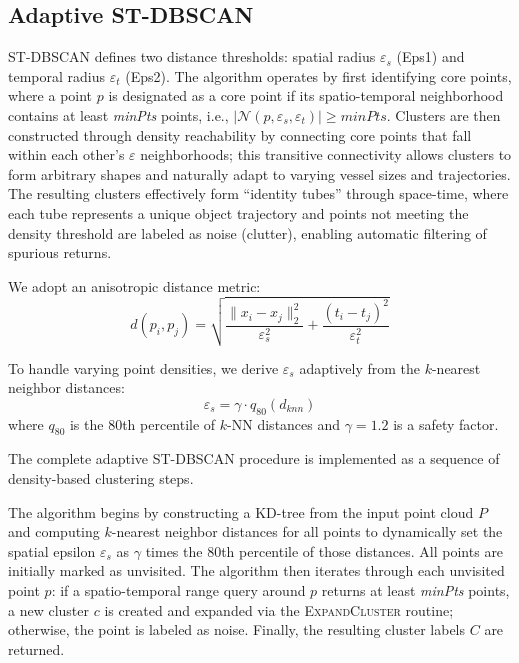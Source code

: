 \documentclass[conf]{new-aiaa}
\begin{document}
\subsection{Adaptive ST-DBSCAN}
ST-DBSCAN defines two distance thresholds: spatial radius $\varepsilon_s$ (Eps1) and temporal radius $\varepsilon_t$ (Eps2). The algorithm operates by first identifying core points, where a point $p$ is designated as a core point if its spatio-temporal neighborhood contains at least \textit{minPts} points, i.e., $|\mathcal{N}(p, \varepsilon_s, \varepsilon_t)| \geq \textit{minPts}$. Clusters are then constructed through density reachability by connecting core points that fall within each other's $\varepsilon$ neighborhoods; this transitive connectivity allows clusters to form arbitrary shapes and naturally adapt to varying vessel sizes and trajectories. The resulting clusters effectively form ``identity tubes'' through space-time, where each tube represents a unique object trajectory and points not meeting the density threshold are labeled as noise (clutter), enabling automatic filtering of spurious returns.

We adopt an anisotropic distance metric:
\begin{equation}
    d(p_i, p_j) = \sqrt{\frac{\|x_i - x_j\|_2^2}{\varepsilon_s^2} + \frac{(t_i - t_j)^2}{\varepsilon_t^2}}
\end{equation}

To handle varying point densities, we derive $\varepsilon_s$ adaptively from the $k$-nearest neighbor distances:
\begin{equation}
    \varepsilon_s = \gamma \cdot q_{80}(d_{knn})
\end{equation}
where $q_{80}$ is the 80th percentile of $k$-NN distances and $\gamma = 1.2$ is a safety factor.

The complete adaptive ST-DBSCAN procedure is implemented as a sequence of density-based clustering steps. 

The algorithm begins by constructing a KD-tree from the input point cloud $P$ and computing $k$-nearest neighbor distances for all points to dynamically set the spatial epsilon $\varepsilon_s$ as $\gamma$ times the 80th percentile of those distances. All points are initially marked as unvisited. The algorithm then iterates through each unvisited point $p$: if a spatio-temporal range query around $p$ returns at least \textit{minPts} points, a new cluster $c$ is created and expanded via the \textsc{ExpandCluster} routine; otherwise, the point is labeled as noise. Finally, the resulting cluster labels $C$ are returned.
\end{document}
